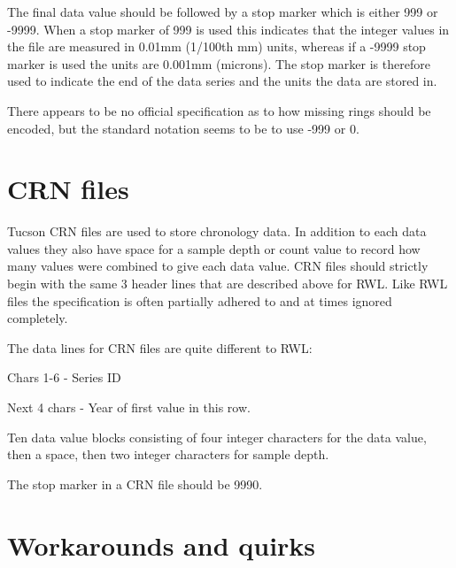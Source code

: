 The final data value should be followed by a stop marker which is either 999 or -9999. When a stop marker of 999 is used this indicates that the integer values in the file are measured in 0.01mm (1/100th mm) units, whereas if a -9999 stop marker is used the units are 0.001mm (microns). The stop marker is therefore used to indicate the end of the data series and the units the data are stored in.

There appears to be no official specification as to how missing rings should be encoded, but the standard notation seems to be to use -999 or 0. 

\section{CRN files}

Tucson CRN files are used to store chronology data. In addition to each data values they also have space for a sample depth or count value to record how many values were combined to give each data value. CRN files should strictly begin with the same 3 header lines that are described above for RWL. Like RWL files the specification is often partially adhered to and at times ignored completely.

The data lines for CRN files are quite different to RWL:

\begin{itemize*}
    \item  Chars 1-6 - Series ID
    \item  Next 4 chars - Year of first value in this row.
    \item  Ten data value blocks consisting of four integer characters for the data value, then a space, then two integer characters for sample depth. 
\end{itemize*}

The stop marker in a CRN file should be 9990. 

\section{Workarounds and quirks}


